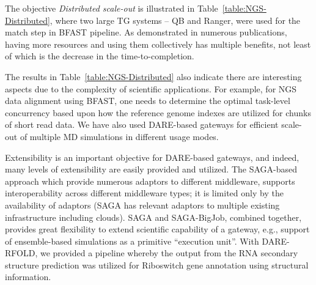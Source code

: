 \documentclass{sig-alternate}
\begin{document}
The objective {\it Distributed scale-out} is illustrated in
Table~\ref{table:NGS-Distributed}, where two large TG systems -- QB
and Ranger, were used for the match step in BFAST pipeline.  As
demonstrated in numerous publications, having more resources and using
them collectively has multiple benefits, not least of which is the
decrease in the time-to-completion.


The results in Table~\ref{table:NGS-Distributed} also indicate there
are interesting aspects due to the complexity of scientific
applications.  For example, for NGS data alignment using BFAST, one
needs to determine the optimal task-level concurrency based upon how
the reference genome indexes are utilized for chunks of short read
data\cite{ecmls11}. We have also used DARE-based gateways for
efficient scale-out of multiple MD simulations in different usage
modes.



Extensibility is an important objective for DARE-based gateways, and
indeed, many levels of extensibility are easily provided and utilized.
The SAGA-based approach which provide numerous adaptors to different
middleware, supports interoperability across different middleware
types; it is limited only by the availability of adaptors (SAGA has
relevant adaptors to multiple existing infrastructure including
clouds). SAGA and SAGA-BigJob, combined together,
provides great flexibility to extend scientific capability of a
gateway, e.g., support of ensemble-based simulations as a primitive
``execution unit''. With DARE-RFOLD, we provided a pipeline whereby
the output from the RNA secondary structure prediction
was utilized for Riboswitch gene annotation using structural
information. %
\end{document}
